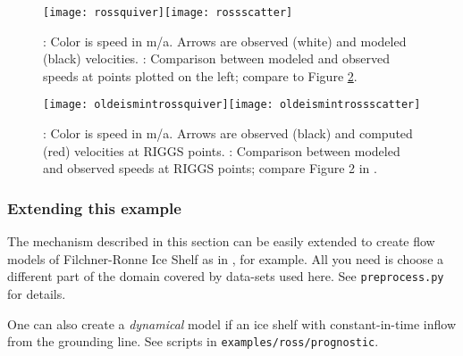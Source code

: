 \begin{figure}[ht]
\centering
\mbox{\texttt{[image: rossquiver]}\quad \texttt{[image: rossscatter]}}
\caption{: Color is speed in m/a.  Arrows are observed (white) and modeled (black) velocities.  : Comparison between modeled and observed speeds at points plotted on the left; compare to Figure \ref{fig:eisrosspython}.}
\label{fig:rosspython}
\end{figure}

\begin{figure}[ht]
\centering
\mbox{\texttt{[image: oldeismintrossquiver]}\quad \texttt{[image: oldeismintrossscatter]}}
\caption{: Color is speed in m/a.  Arrows are observed (black) and computed (red) velocities at RIGGS points.  : Comparison between modeled and observed speeds at RIGGS points; compare Figure 2 in \cite{MacAyealetal}.}
\label{fig:eisrosspython}
\end{figure}

\subsubsection*{Extending this example}

The mechanism described in this section can be easily extended to create flow models of Filchner-Ronne Ice Shelf as in \cite{AlbrechtLevermann2012}, for example. All you need is choose a different part of the domain covered by data-sets used here. See \texttt{preprocess.py} for details.

One can also create a \emph{dynamical} model if an ice shelf with constant-in-time inflow from the grounding line. See scripts in \texttt{examples/ross/prognostic}.

